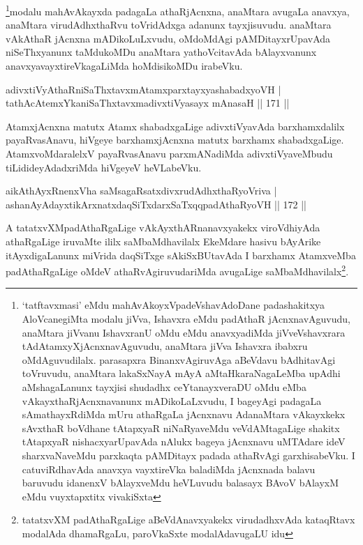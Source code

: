 \begin{artha}
\footnote{`tatftavxmasi' eMdu mahAvAkoyxVpadeVshavAdoDane padashakitxya AloVcanegiMta modalu jiVva, Ishavxra eMdu padAthaR jAcnxnavAguvudu, anaMtara jiVvanu IshavxranU oMdu eMdu anavxyadiMda jiVveVshavxrara tAdAtamxyXjAcnxnavAguvudu, anaMtara jiVva Ishavxra ibabxru oMdAguvudilalx. parasapxra BinanxvAgiruvAga aBeVdavu bAdhitavAgi toVruvudu, anaMtara lakaSxNayA mAyA aMtaHkaraNagaLeMba upAdhi aMshagaLanunx tayxjisi shudadhx ceYtanayxveraDU oMdu eMba vAkayxthaRjAcnxnavanunx mADikoLaLxvudu, I bageyAgi padagaLa sAmathayxRdiMda mUru athaRgaLa jAcnxnavu AdanaMtara vAkayxkekx sAvxthaR boVdhane tAtapxyaR niNaRyaveMdu veVdAMtagaLige shakitx tAtapxyaR nishacxyarUpavAda nAlukx bageya jAcnxnavu uMTAdare ideV sharxvaNaveMdu parxkaqta pAMDitayx padada athaRvAgi garxhisabeVku. I catuviRdhavAda anavxya vayxtireVka baladiMda jAcnxnada balavu baruvudu idanenxV bAlayxveMdu heVLuvudu balasayx BAvoV bAlayxM eMdu vuyxtapxtitx vivakiSxta}modalu mahAvAkayxda padagaLa athaRjAcnxna, anaMtara avugaLa anavxya, anaMtara virudAdhxthaRvu toVridAdxga adanunx tayxjisuvudu. anaMtara vAkAthaR jAcnxna mADikoLuLxvudu, oMdoMdAgi pAMDitayxrUpavAda niSeThxyanunx taMdukoMDu anaMtara yathoVcitavAda bAlayxvanunx anavxyavayxtireVkagaLiMda hoMdisikoMDu irabeVku.
\end{artha}


\begin{shl}
adivxtiVyAthaRniSaThxtavxmAtamxparxtayxyashabadxyoVH |\\
tathAcA\s \s temxYkaniSaThxtavxmadivxtiVyasayx mAnasaH \hfill || 171 ||
\end{shl}

\begin{artha}
AtamxjAcnxna matutx Atamx shabadxgaLige adivxtiVyavAda barxhamxdalilx payaRvasAnavu, hiVgeye barxhamxjAcnxna matutx barxhamx shabadxgaLige. AtamxvoMdaralelxV payaRvasAnavu parxmANadiMda adivxtiVyaveMbudu tiLidideyAdadxriMda hiVgeyeV heVLabeVku.
\end{artha}

\begin{shl}
aikAthAyxRnenxVha saMsagaRsatxdivxrudAdhxthaRyoVriva |\\
ashanAyAdayxtikArxnatxdaqSiTxdarxSaTxqqpadAthaRyoVH \hfill || 172 ||
\end{shl}

\begin{artha}
A tatatxvXMpadAthaRgaLige vAkAyxthARnanavxyakekx viroVdhiyAda athaRgaLige iruvaMte ililx saMbaMdhavilalx EkeMdare hasivu bAyArike itAyxdigaLanunx miVrida daqSiTxge sAkiSxBUtavAda I barxhamx AtamxveMba padAthaRgaLige oMdeV athaRvAgiruvudariMda avugaLige saMbaMdhavilalx\footnote{tatatxvXM padAthaRgaLige aBeVdAnavxyakekx virudadhxvAda kataqRtavx modalAda dhamaRgaLu, paroVkaSxte modalAdavugaLU idu}.
\end{artha}

